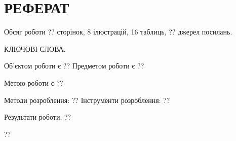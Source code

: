 \chapter*[Реферат]{РЕФЕРАТ}
Обсяг роботи ?? сторінок, 8 ілюстрацій, 16 таблиць, ?? джерел посилань. \medskip

\MakeUppercase{ключові слова.} \medskip

Об'єктом роботи є ?? Предметом роботи є ?? \medskip

Метою роботи є ?? \medskip

Методи розроблення: ?? Інструменти розроблення: ?? \medskip

Результати роботи: ??  \medskip

??
